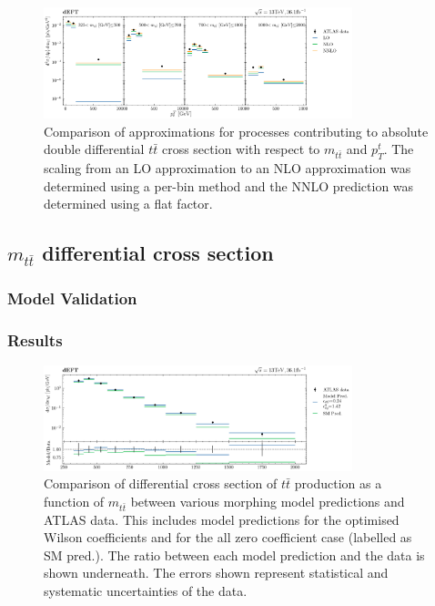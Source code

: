 \documentclass[a4paper]{article}
\begin{document}
\begin{figure}
    \centering
    \includegraphics[width=0.8\textwidth]{plots/k_factor.png}
    \caption{Comparison of approximations for processes contributing to absolute double differential $t\bar{t}$ cross section with respect to $m_{t\bar{t}}$ and $p_{T}^{t}$. The scaling from an LO approximation to an NLO approximation was determined using a per-bin method and the NNLO prediction was determined using a flat factor.}
    \label{fig:kfactor}
\end{figure}


\subsection{\texorpdfstring{$m_{t\bar{t}}$}{mttbar} differential cross section}
\subsubsection{Model Validation}
\subsubsection{Results}

\begin{figure}
    \centering
    \includegraphics[width=0.8\textwidth]{plots/ATLAS_model_result_1D_2OP.png}
    \caption{Comparison of differential cross section of $t\bar{t}$ production as a function of $m_{t\bar{t}}$ between various morphing model predictions and ATLAS data. This includes model predictions for the optimised Wilson coefficients and for the all zero coefficient case (labelled as SM pred.). The ratio between each model prediction and the data is shown underneath. The errors shown represent statistical and systematic uncertainties of the data.}
    \label{fig:model_result_1D_2OP}
\end{figure}
\end{document}
